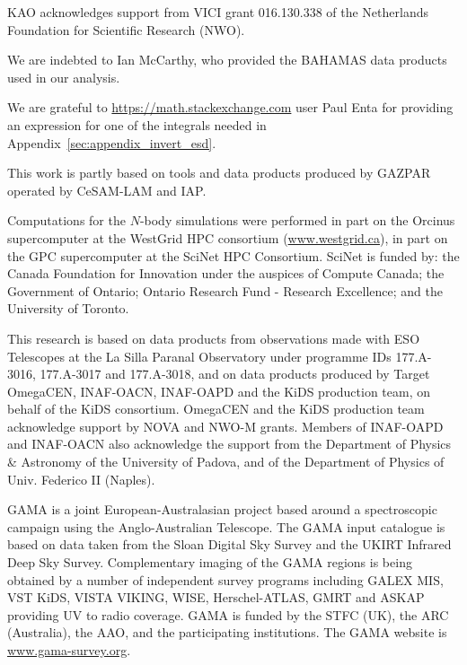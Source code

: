 \documentclass[usenatbib]{mnras}
\begin{document}
KAO acknowledges support from VICI grant 016.130.338 of the Netherlands Foundation for Scientific Research (NWO).

We are indebted to Ian McCarthy, who provided the BAHAMAS data products used in our analysis.

We are grateful to \url{https://math.stackexchange.com} user Paul Enta for providing an expression for one of the integrals needed in Appendix~\ref{sec:appendix_invert_esd}.

This work is partly based on tools and data products produced by GAZPAR operated by CeSAM-LAM and IAP.


Computations for the $N$-body simulations were performed in part on the Orcinus supercomputer at the WestGrid HPC consortium (\url{www.westgrid.ca}), in part on the GPC supercomputer at the SciNet HPC Consortium. SciNet is funded by: the Canada Foundation for Innovation under the auspices of Compute Canada; the Government of Ontario; Ontario Research Fund - Research Excellence; and the University of Toronto.

This research is based on data products from observations made with ESO Telescopes at the La Silla Paranal Observatory under programme IDs 177.A-3016, 177.A-3017 and 177.A-3018, and on data products produced by Target OmegaCEN, INAF-OACN, INAF-OAPD and the KiDS production team, on behalf of the KiDS consortium. OmegaCEN and the KiDS production team acknowledge support by NOVA and NWO-M grants. Members of INAF-OAPD and INAF-OACN also acknowledge the support from the Department of Physics \& Astronomy of the University of Padova, and of the Department of Physics of Univ. Federico II (Naples).

GAMA is a joint European-Australasian project based around a spectroscopic campaign using the Anglo-Australian Telescope. The GAMA input catalogue is based on data taken from the Sloan Digital Sky Survey and the UKIRT Infrared Deep Sky Survey. Complementary imaging of the GAMA regions is being obtained by a number of independent survey programs including GALEX MIS, VST KiDS, VISTA VIKING, WISE, Herschel-ATLAS, GMRT and ASKAP providing UV to radio coverage. GAMA is funded by the STFC (UK), the ARC (Australia), the AAO, and the participating institutions. The GAMA website is \url{www.gama-survey.org}.
\end{document}
